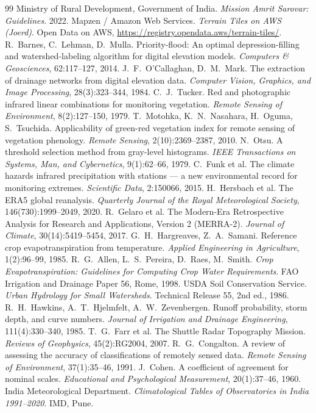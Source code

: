 \documentclass[11pt,a4paper]{article}
\begin{document}
\begin{thebibliography}{99}\small
{} Ministry of Rural Development, Government of India. \emph{Mission Amrit Sarovar: Guidelines}. 2022.
 Mapzen / Amazon Web Services. \emph{Terrain Tiles on AWS (Joerd)}. Open Data on AWS, \url{https://registry.opendata.aws/terrain-tiles/}.
 R.~Barnes, C.~Lehman, D.~Mulla. Priority-flood: An optimal depression-filling and watershed-labeling algorithm for digital elevation models. \emph{Computers \& Geosciences}, 62:117--127, 2014.
 J.~F.~O'Callaghan, D.~M.~Mark. The extraction of drainage networks from digital elevation data. \emph{Computer Vision, Graphics, and Image Processing}, 28(3):323--344, 1984.
 C.~J.~Tucker. Red and photographic infrared linear combinations for monitoring vegetation. \emph{Remote Sensing of Environment}, 8(2):127--150, 1979.
 T.~Motohka, K.~N.~Nasahara, H.~Oguma, S.~Tsuchida. Applicability of green-red vegetation index for remote sensing of vegetation phenology. \emph{Remote Sensing}, 2(10):2369--2387, 2010.
 N.~Otsu. A threshold selection method from gray-level histograms. \emph{IEEE Transactions on Systems, Man, and Cybernetics}, 9(1):62--66, 1979.
 C.~Funk et al. The climate hazards infrared precipitation with stations --- a new environmental record for monitoring extremes. \emph{Scientific Data}, 2:150066, 2015.
 H.~Hersbach et al. The ERA5 global reanalysis. \emph{Quarterly Journal of the Royal Meteorological Society}, 146(730):1999--2049, 2020.
 R.~Gelaro et al. The Modern-Era Retrospective Analysis for Research and Applications, Version 2 (MERRA-2). \emph{Journal of Climate}, 30(14):5419--5454, 2017.
 G.~H.~Hargreaves, Z.~A.~Samani. Reference crop evapotranspiration from temperature. \emph{Applied Engineering in Agriculture}, 1(2):96--99, 1985.
 R.~G.~Allen, L.~S.~Pereira, D.~Raes, M.~Smith. \emph{Crop Evapotranspiration: Guidelines for Computing Crop Water Requirements}. FAO Irrigation and Drainage Paper 56, Rome, 1998.
 USDA Soil Conservation Service. \emph{Urban Hydrology for Small Watersheds}. Technical Release 55, 2nd ed., 1986.
 R.~H.~Hawkins, A.~T.~Hjelmfelt, A.~W.~Zevenbergen. Runoff probability, storm depth, and curve numbers. \emph{Journal of Irrigation and Drainage Engineering}, 111(4):330--340, 1985.
 T.~G.~Farr et al. The Shuttle Radar Topography Mission. \emph{Reviews of Geophysics}, 45(2):RG2004, 2007.
 R.~G.~Congalton. A review of assessing the accuracy of classifications of remotely sensed data. \emph{Remote Sensing of Environment}, 37(1):35--46, 1991.
 J.~Cohen. A coefficient of agreement for nominal scales. \emph{Educational and Psychological Measurement}, 20(1):37--46, 1960.
 India Meteorological Department. \emph{Climatological Tables of Observatories in India 1991--2020}. IMD, Pune.
\end{thebibliography}
\end{document}
